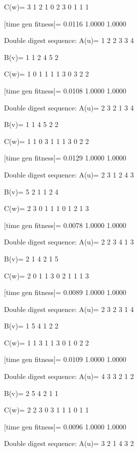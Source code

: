 C(w)=
     3     1     2     1     0     2     3     0     1     1     1

[time gen fitness]=
    0.0116    1.0000    1.0000

Double digest sequence:
A(u)=
     1     2     2     3     3     4

B(v)=
     1     1     2     4     5     2

C(w)=
     1     0     1     1     1     1     3     0     3     2     2

[time gen fitness]=
    0.0108    1.0000    1.0000

Double digest sequence:
A(u)=
     2     3     2     1     3     4

B(v)=
     1     1     4     5     2     2

C(w)=
     1     1     0     3     1     1     1     3     0     2     2

[time gen fitness]=
    0.0129    1.0000    1.0000

Double digest sequence:
A(u)=
     2     3     1     2     4     3

B(v)=
     5     2     1     1     2     4

C(w)=
     2     3     0     1     1     1     0     1     2     1     3

[time gen fitness]=
    0.0078    1.0000    1.0000

Double digest sequence:
A(u)=
     2     2     3     4     1     3

B(v)=
     2     1     4     2     1     5

C(w)=
     2     0     1     1     3     0     2     1     1     1     3

[time gen fitness]=
    0.0089    1.0000    1.0000

Double digest sequence:
A(u)=
     2     3     2     3     1     4

B(v)=
     1     5     4     1     2     2

C(w)=
     1     1     3     1     1     3     0     1     0     2     2

[time gen fitness]=
    0.0109    1.0000    1.0000

Double digest sequence:
A(u)=
     4     3     3     2     1     2

B(v)=
     2     5     4     2     1     1

C(w)=
     2     2     3     0     3     1     1     1     0     1     1

[time gen fitness]=
    0.0096    1.0000    1.0000

Double digest sequence:
A(u)=
     3     2     1     4     3     2

